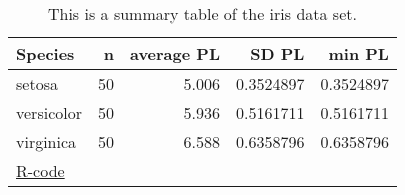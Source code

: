 \begin{table}

\caption{\label{tab:}This is a summary table of the iris data set.
        }
\centering
\begin{tabular}[t]{lrrrr}
\toprule
Species & n & average PL & SD PL & min PL\\
\midrule
setosa & 50 & 5.006 & 0.3524897 & 0.3524897\\
versicolor & 50 & 5.936 & 0.5161711 & 0.5161711\\
virginica & 50 & 6.588 & 0.6358796 & 0.6358796\\
\bottomrule
\multicolumn{5}{l}{\href{https://github.com/TobiasRoth/RtoAuthorea/blob/master/tables/latex_table/latex_table.R}{R-code}}\\
\end{tabular}
\end{table}
